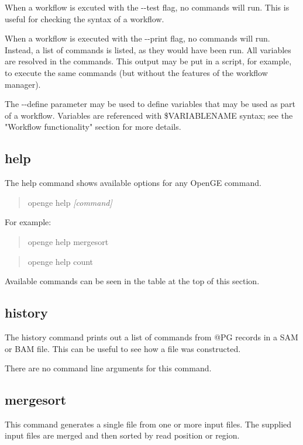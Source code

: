\documentclass[11pt]{article}
\newcommand {\cmd}[1] {\begin{quote}#1\end{quote}}
\begin{document}
When a workflow is excuted with the {-}{-}test flag, no commands will run. This is useful for checking the syntax of a workflow.

When a workflow is executed with the {-}{-}print flag, no commands will run. Instead, a list of commands is listed, as they would have been run. All variables are resolved in the commands. This output may be put in a script, for example, to execute the same commands (but without the features of the workflow manager).

The {-}{-}define parameter may be used to define variables that may be used as part of a workflow. Variables are referenced with \$VARIABLENAME syntax; see the "Workflow functionality" section for more details.

\subsection {help}
The help command shows available options for any OpenGE command. 

\cmd{openge help \textit{[command]}}

For example:

\cmd{openge help mergesort}

\cmd{openge help count}

Available commands can be seen in the table at the top of this section.

\subsection {history}
The history command prints out a list of commands from @PG records in a SAM or BAM file. This can be useful to see how a file was constructed.

There are no command line arguments for this command.

\subsection {mergesort}
\label{mergesort}
This command generates a single file from one or more input files. The supplied input files are merged and then sorted by read position or region.
\end{document}
